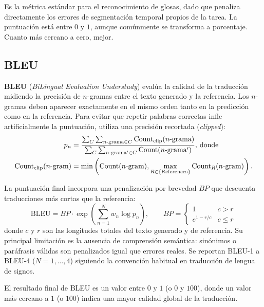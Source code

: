 Es la métrica estándar para el reconocimiento de glosas, dado que penaliza directamente los errores de segmentación temporal propios de la tarea.
La puntuación está entre $0$ y $1$, aunque comúnmente se transforma a porcentaje. Cuanto más cercano a cero, mejor.

\subsection{BLEU}
\textbf{BLEU} (\textit{BiLingual Evaluation Understudy}) \cite{BLEU} evalúa la calidad de la traducción midiendo la precisión de $n$-gramas entre el texto generado y la referencia.
Los $n$-gramas deben aparecer exactamente en el mismo orden tanto en la predicción como en la referencia.
Para evitar que repetir palabras correctas infle artificialmente la puntuación, utiliza una precisión recortada (\textit{clipped}):
\begin{align*}
  p_n &= \frac{
    \sum_{C}\sum_{n\text{-grama}\in C}\mathrm{Count}_{\mathrm{clip}}(n\text{-grama})
  }{
    \sum_{C}\sum_{n\text{-grama}'\in C}\mathrm{Count}(n\text{-grama}')
  }, \hspace{2px}\text{donde} \\
  \text{Count}_{\text{clip}}(n\text{-gram}) &= \min \left(
                              \text{Count}(n\text{-gram}),
                              \max_{R \in \{\text{References}\}} \text{Count}_R(n\text{-gram}) \right).
\end{align*}

La puntuación final incorpora una penalización por brevedad $BP$ que descuenta traducciones más cortas que la referencia:
\begin{equation*}
  \mathrm{BLEU} = BP \cdot \exp\!\left(\sum_{n=1}^{N} w_n \log p_n\right),
  \qquad
  BP = \begin{cases} 1 & c > r \\ e^{1-r/c} & c \leq r \end{cases}
\end{equation*}
donde $c$ y $r$ son las longitudes totales del texto generado y de referencia.
Su principal limitación es la ausencia de comprensión semántica: sinónimos o paráfrasis válidas son penalizados igual que errores reales.
Se reportan BLEU-1 a BLEU-4 ($N=1,\dots,4$) siguiendo la convención habitual en traducción de lengua de signos.

El resultado final de BLEU es un valor entre $0$ y $1$ (o $0$ y $100$), donde un valor más cercano a $1$ (o $100$) indica una mayor calidad global de la traducción.

